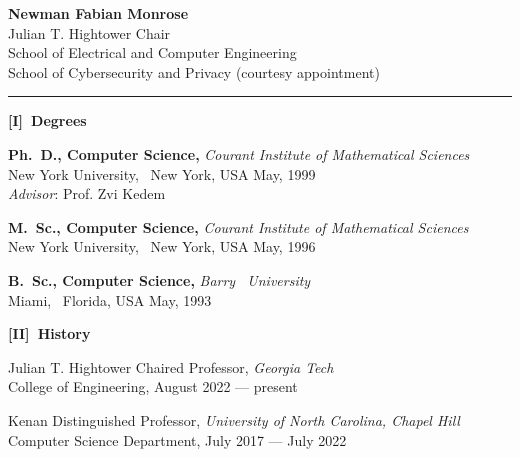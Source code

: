 \documentclass[11pt]{article}
\newcommand{\alignboth}[2]{\noindent \parbox[t]{85pt} {\bf#1} \parbox[t]{400pt}{#2} \vspace{0.5\baselineskip} }
\newcommand{\alignright}[1]{\noindent \parbox[t]{85pt} {\hspace{79pt}} \parbox[t]{400pt}{#1} \vspace{0.5\baselineskip} }
\newcommand{\headingsgap}{\vspace{\baselineskip}}
\begin{document}
\thispagestyle{empty}


\begin{center}
{\LARGE\bfseries Newman Fabian Monrose} \\
Julian T. Hightower Chair \hfill \\
School of Electrical and Computer Engineering \hfill \\
School of Cybersecurity and Privacy (courtesy appointment) \hfill \\

\end{center}

\hrule
\vspace{1\baselineskip}


\alignboth{[I]~Degrees}{{\bf Ph.~D., Computer Science,} \hfill \hfill \hfill
\hfill \hfill \hfill \hfill \hfill {\it Courant Institute of Mathematical Sciences} \\ New York University, \ New York, USA \hfill \hfill \hfill May, 1999\\
{\it Advisor}: Prof. Zvi Kedem}

\alignright{{\bf M.~Sc., Computer Science,} \hfill \hfill \hfill \hfill \hfill \hfill \hfill
{\it \hfill Courant Institute of Mathematical Sciences} \\ New York University, \ New York, USA \hfill \hfill \hfill May, 1996}

\alignright{{\bf B.~Sc., Computer Science, \hfill \hfill \hfill \hfill \hfill} \hfill \hfill \hfill \hfill \hfill \hfill {\it Barry \ University} \\ \hfill\hfill Miami, \ Florida, USA \hfill May, 1993}
\headingsgap

\alignboth{\bf [II]~History}{{\sc Julian T. Hightower Chaired Professor}, \hfill{\it Georgia Tech} \\ College of Engineering, \hfill August 2022 --- present}

\alignright{{\sc Kenan Distinguished Professor}, \hfill{\it University of North Carolina, Chapel Hill} \\ Computer Science Department, \hfill July 2017 --- July 2022}
\end{document}
